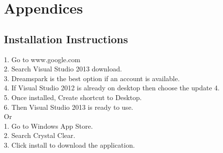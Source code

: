 \documentclass[runningheads,a4paper]{llncs}
\begin{document}
\section{Appendices}
\label{sec:Appendices}
\subsection{Installation Instructions}
1. Go to www.google.com \\
2. Search Visual Studio 2013 download.\\
3. Dreamspark is the best option if an account is available.\\
4. If Visual Studio 2012 is already on desktop then choose the update 4.\\
5. Once installed, Create shortcut to Desktop.\\
6. Then Visual Studio 2013 is ready to use.\\
		Or\\
1. Go to Windows App Store.\\
2. Search Crystal Clear.\\
3. Click install to download the application.\\
\end{document}
